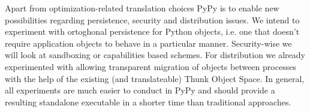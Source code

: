 \documentclass[a4paper,11pt,english]{article}
\begin{document}
Apart from optimization-related translation choices PyPy is to enable
new possibilities regarding persistence, security and distribution
issues.  We intend to experiment with ortoghonal persistence for
Python objects, i.e. one that doesn't require application objects to
behave in a particular manner.  Security-wise we will look at
sandboxing or capabilities based schemes.  For distribution we already
experimented with allowing transparent migration of objects between
processes with the help of the existing (and translateable) Thunk
Object Space.  In general, all experiments are much easier to conduct
in PyPy and should provide a resulting standalone executable in
a shorter time than traditional approaches.
\end{document}
